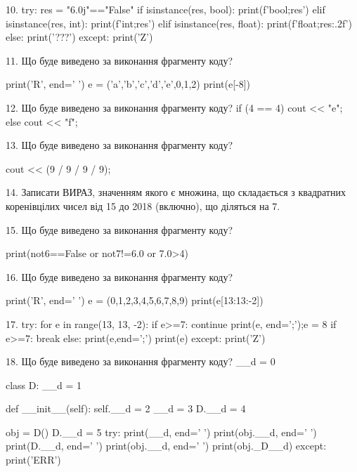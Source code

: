 \documentclass[11pt]{article}
\begin{document}
10. 
try:
    res = "6.0j"=="False"
    if isinstance(res, bool):
        print(f'bool;{res}')
    elif isinstance(res, int):
        print(f'int;{res}')
    elif isinstance(res, float):
        print(f'float;{res:.2f}')
    else:
        print('???')
except:
    print('Z')


11. Що буде виведено за виконання фрагменту коду?

print('R', end=' ')
e = ('a','b','c','d','e',0,1,2)
print(e[-8])



12. Що буде виведено за виконання фрагменту коду?
if (4 == 4)
    cout << "e";
else
    cout << "f";



13. Що буде виведено за виконання фрагменту коду?

cout << (9 / 9 / 9 / 9);


14. 
Записати ВИРАЗ, значенням якого є множина, що складається з квадратних коренівцілих чисел від 15 до 2018 (включно), що діляться на 7.

15. Що буде виведено за виконання фрагменту коду?

print(not6==False or not7!=6.0 or 7.0>4)


16. Що буде виведено за виконання фрагменту коду?

print('R', end=' ')
e = (0,1,2,3,4,5,6,7,8,9)
print(e[13:13:-2])



17. 
try:
    for e in range(13, 13, -2):
        if e>=7:
            continue
        print(e, end=';');e = 8
        if e>=7:
            break
    else:
        print(e,end=';')
    print(e)
except:
    print('Z')


18. Що буде виведено за виконання фрагменту коду?
__d = 0

class D:
    __d = 1
    
    def __init__(self):
        self.__d = 2
        __d = 3
        D.__d = 4

obj = D()
D.__d = 5
try:
    print(__d, end=' ')
    print(obj.__d, end=' ')
    print(D.__d, end=' ')
    print(obj.__d, end=' ')
    print(obj._D__d)
except:
    print('ERR')
\end{document}
